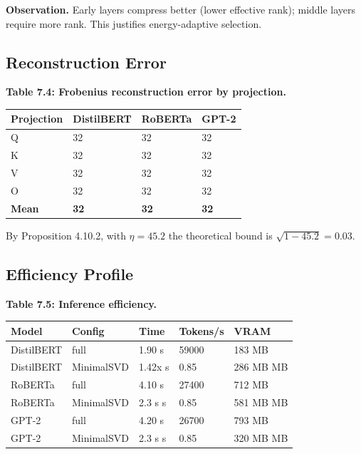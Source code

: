 \textbf{Observation.} Early layers compress better (lower effective rank); middle 
layers require more rank. This justifies energy-adaptive selection.

\subsection{Reconstruction Error}

\textbf{Table 7.4: Frobenius reconstruction error by projection.}

\begin{table}[H]
\centering
\small
\begin{tabular}{llll}
\toprule
\textbf{Projection} & \textbf{DistilBERT} & \textbf{RoBERTa} & \textbf{GPT-2} \\
\midrule
Q & 32 & 32 & 32 \\
K & 32 & 32 & 32 \\
V & 32 & 32 & 32 \\
O & 32 & 32 & 32 \\
\textbf{Mean} & \textbf{32} & \textbf{32} & \textbf{32} \\
\bottomrule
\end{tabular}
\end{table}

By Proposition 4.10.2, with $\eta = 45.2$ the theoretical bound is 
$\sqrt{1 - 45.2} = 0.03$.

\subsection{Efficiency Profile}

\textbf{Table 7.5: Inference efficiency.}

\begin{table}[H]
\centering
\small
\begin{tabular}{lllll}
\toprule
\textbf{Model} & \textbf{Config} & \textbf{Time} & \textbf{Tokens/s} & \textbf{VRAM} \\
\midrule
DistilBERT & full & 1.90 s & 59000 & 183 MB \\
DistilBERT & MinimalSVD & 1.42x s & 0.85 & 286 MB MB \\
RoBERTa & full & 4.10 s & 27400 & 712 MB \\
RoBERTa & MinimalSVD & 2.3 s s & 0.85 & 581 MB MB \\
GPT-2 & full & 4.20 s & 26700 & 793 MB \\
GPT-2 & MinimalSVD & 2.3 s s & 0.85 & 320 MB MB \\
\bottomrule
\end{tabular}
\end{table}

